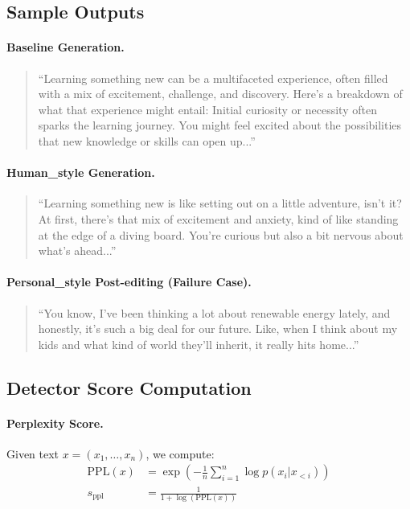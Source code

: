 \subsection{Sample Outputs}

\paragraph{Baseline Generation.}
\begin{quote}
``Learning something new can be a multifaceted experience, often filled with a mix of excitement, challenge, and discovery. Here's a breakdown of what that experience might entail: Initial curiosity or necessity often sparks the learning journey. You might feel excited about the possibilities that new knowledge or skills can open up...''
\end{quote}

\paragraph{Human\_style Generation.}
\begin{quote}
``Learning something new is like setting out on a little adventure, isn't it? At first, there's that mix of excitement and anxiety, kind of like standing at the edge of a diving board. You're curious but also a bit nervous about what's ahead...''
\end{quote}

\paragraph{Personal\_style Post-editing (Failure Case).}
\begin{quote}
``You know, I've been thinking a lot about renewable energy lately, and honestly, it's such a big deal for our future. Like, when I think about my kids and what kind of world they'll inherit, it really hits home...''
\end{quote}

\subsection{Detector Score Computation}

\paragraph{Perplexity Score.}
Given text $x = (x_1, \ldots, x_n)$, we compute:
\begin{align}
    \text{PPL}(x) &= \exp\left(-\frac{1}{n}\sum_{i=1}^{n} \log p(x_i | x_{<i})\right) \\
    s_{\text{ppl}} &= \frac{1}{1 + \log(\text{PPL}(x))}
\end{align}


